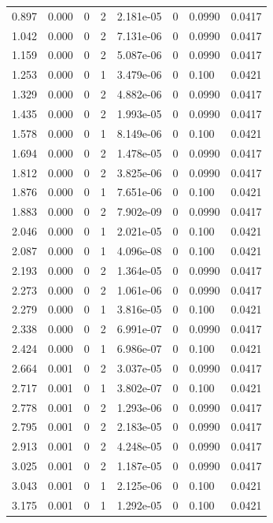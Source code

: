 \documentclass[preview]{standalone}
\begin{document}
{{\begin{tabular}{L{1.2cm}C{1.2cm} C{0.3cm}C{0.5cm} C{1.4cm}C{1.4cm} C{1.4cm}C{1.4cm}}
  0.897  &  0.000  & 0     &  2 &  2.181e-05  & 0  & 0.0990 &  0.0417   \\ 
  1.042  &  0.000  & 0     &  2 &  7.131e-06  & 0  & 0.0990 &  0.0417   \\ 
  1.159  &  0.000  & 0     &  2 &  5.087e-06  & 0  & 0.0990 &  0.0417   \\ 
  1.253  &  0.000  & 0     &  1 &  3.479e-06  & 0  & 0.100 &  0.0421   \\ 
  1.329  &  0.000  & 0     &  2 &  4.882e-06  & 0  & 0.0990 &  0.0417   \\ 
  1.435  &  0.000  & 0     &  2 &  1.993e-05  & 0  & 0.0990 &  0.0417   \\ 
  1.578  &  0.000  & 0     &  1 &  8.149e-06  & 0  & 0.100 &  0.0421   \\ 
  1.694  &  0.000  & 0     &  2 &  1.478e-05  & 0  & 0.0990 &  0.0417   \\ 
  1.812  &  0.000  & 0     &  2 &  3.825e-06  & 0  & 0.0990 &  0.0417   \\ 
  1.876  &  0.000  & 0     &  1 &  7.651e-06  & 0  & 0.100 &  0.0421   \\ 
  1.883  &  0.000  & 0     &  2 &  7.902e-09  & 0  & 0.0990 &  0.0417   \\ 
  2.046  &  0.000  & 0     &  1 &  2.021e-05  & 0  & 0.100 &  0.0421   \\ 
  2.087  &  0.000  & 0     &  1 &  4.096e-08  & 0  & 0.100 &  0.0421   \\ 
  2.193  &  0.000  & 0     &  2 &  1.364e-05  & 0  & 0.0990 &  0.0417   \\ 
  2.273  &  0.000  & 0     &  2 &  1.061e-06  & 0  & 0.0990 &  0.0417   \\ 
  2.279  &  0.000  & 0     &  1 &  3.816e-05  & 0  & 0.100 &  0.0421   \\ 
  2.338  &  0.000  & 0     &  2 &  6.991e-07  & 0  & 0.0990 &  0.0417   \\ 
  2.424  &  0.000  & 0     &  1 &  6.986e-07  & 0  & 0.100 &  0.0421   \\ 
  2.664  &  0.001  & 0     &  2 &  3.037e-05  & 0  & 0.0990 &  0.0417   \\ 
  2.717  &  0.001  & 0     &  1 &  3.802e-07  & 0  & 0.100 &  0.0421   \\ 
  2.778  &  0.001  & 0     &  2 &  1.293e-06  & 0  & 0.0990 &  0.0417   \\ 
  2.795  &  0.001  & 0     &  2 &  2.183e-05  & 0  & 0.0990 &  0.0417   \\ 
  2.913  &  0.001  & 0     &  2 &  4.248e-05  & 0  & 0.0990 &  0.0417   \\ 
  3.025  &  0.001  & 0     &  2 &  1.187e-05  & 0  & 0.0990 &  0.0417   \\ 
  3.043  &  0.001  & 0     &  1 &  2.125e-06  & 0  & 0.100 &  0.0421   \\ 
  3.175  &  0.001  & 0     &  1 &  1.292e-05  & 0  & 0.100 &  0.0421   \\ 
\hline 
\end{tabular} 

}}
\end{document}

